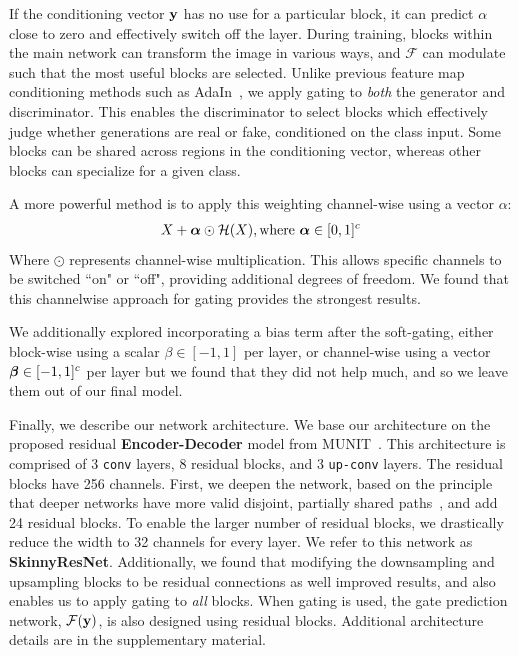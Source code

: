 If the conditioning vector ${\bf y}$ has no use for a particular block, it can predict $\alpha$ close to zero and effectively switch off the layer.
During training, blocks within the main network can transform the image in various ways, and $\mathcal{F}$ can modulate such that the most useful blocks are selected. 
Unlike previous feature map conditioning methods such as AdaIn~\cite{ulyanovinstance}, we apply gating to \emph{both} the generator and discriminator. 
This enables the discriminator to select blocks which effectively judge whether generations are real or fake, conditioned on the class input.
Some blocks can be shared across regions in the conditioning vector, whereas other blocks can specialize for a given class.

A more powerful method is to apply this weighting channel-wise using a vector {\boldmath$\alpha$}: %
\begin{align}
X + \mbox{\boldmath $\alpha$} \odot \mathcal{H}(X), \text{where } \mbox{\boldmath $\alpha$} \in [0,1]^c 
\end{align}
Where $\odot$ represents channel-wise multiplication. This allows specific channels to be switched ``on" or ``off", providing additional degrees of freedom.
We found that this channelwise approach for gating provides the strongest results. 

We additionally explored incorporating a bias term after the soft-gating, either block-wise using a scalar $\beta \in [-1,1]$ per layer, or channel-wise using a vector $\mbox{\boldmath $\beta$} \in [-1, 1]^c$ per layer but we found that they did not help much, and so we leave them out of our final model.




Finally, we describe our network architecture. 
We base our architecture on the proposed residual \textbf{Encoder-Decoder} model from MUNIT~\cite{huang2018multimodal}.
This architecture is comprised of 3 \texttt{conv} layers, 8 residual blocks, and 3 \texttt{up-conv} layers. The residual blocks have 256 channels. 
First, we deepen the network, based on the principle that deeper networks have more valid disjoint, partially shared paths~\cite{veit2016residual}, and add 24 residual blocks. 
To enable the larger number of residual blocks, we drastically reduce the width to 32 channels for every layer. 
We refer to this network as \textbf{SkinnyResNet}. 
Additionally, we found that modifying the downsampling and upsampling blocks to be residual connections as well improved results, and also enables us to apply gating to {\em all} blocks. 
When gating is used, the gate prediction network, $\mathcal{F} ({\bf y})$,  
is also designed using residual blocks. Additional architecture details are in the supplementary material. 

